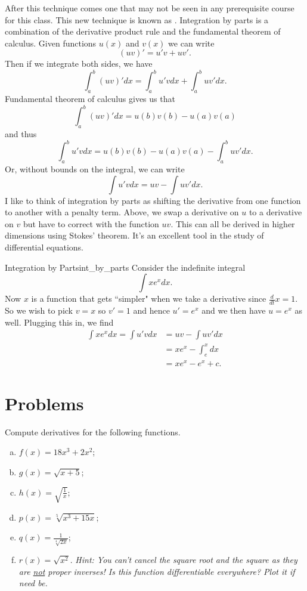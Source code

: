     After this technique comes one that may not be seen in any prerequisite course for this class.  This new technique is known as . Integration by parts is a combination of the derivative product rule and the fundamental theorem of calculus.  Given functions $u(x)$ and $v(x)$ we can write
    \[
    (uv)'=u'v+uv'.
    \]
    Then if we integrate both sides, we have
    \[
    \int_a^b (uv)'dx = \int_a^b u'vdx + \int_a^b uv'dx.
    \]
    Fundamental theorem of calculus gives us that
    \[
    \int_a^b (uv)'dx = u(b)v(b)-u(a)v(a)
    \]
    and thus
    \[
    \int_a^b u'vdx = u(b)v(b)-u(a)v(a)-\int_a^b uv'dx.
    \]
    Or, without bounds on the integral, we can write
    \[
    \int u'vdx = uv - \int uv'dx.
    \]
    I like to think of integration by parts as shifting the derivative from one function to another with a penalty term.  Above, we swap a derivative on $u$ to a derivative on $v$ but have to correct with the function $uv$.  This can all be derived in higher dimensions using Stokes' theorem. It's an excellent tool in the study of differential equations.

    \begin{ex}{Integration by Parts}{int_by_parts}
        Consider the indefinite integral
        \[
        \int xe^x dx.
        \]
        Now $x$ is a function that gets ``simpler" when we take a derivative since $\frac{d}{dt}x= 1$.  So we wish to pick $v=x$ so $v'=1$ and hence $u'=e^x$ and we then have $u=e^x$ as well.  Plugging this in, we find
        \begin{align*}
            \int xe^x dx = \int u'vdx &= uv - \int uv'dx\\
            &= xe^x-\int_e^xdx\\
            &= xe^x - e^x + c.
        \end{align*}
    \end{ex}

    \section*{Problems}

    \begin{problem}
    Compute derivatives for the following functions.
    \begin{enumerate}[(a)]
        \item $f(x)=18x^3+2x^2$;
        \item $g(x)=\sqrt{x+5}$;
        \item $h(x)=\sqrt{\frac{1}{x}}$;
        \item $p(x)=\sqrt[5]{x^3+15x}$;
        \item $q(x)=\frac{1}{\sqrt[4]{2x}}$;
        \item $r(x)=\sqrt{x^2}$. \emph{Hint: You can't cancel the square root and the square as they are \underline{not} proper inverses! Is this function differentiable everywhere? Plot it if need be.}
    \end{enumerate}
    \end{problem}

